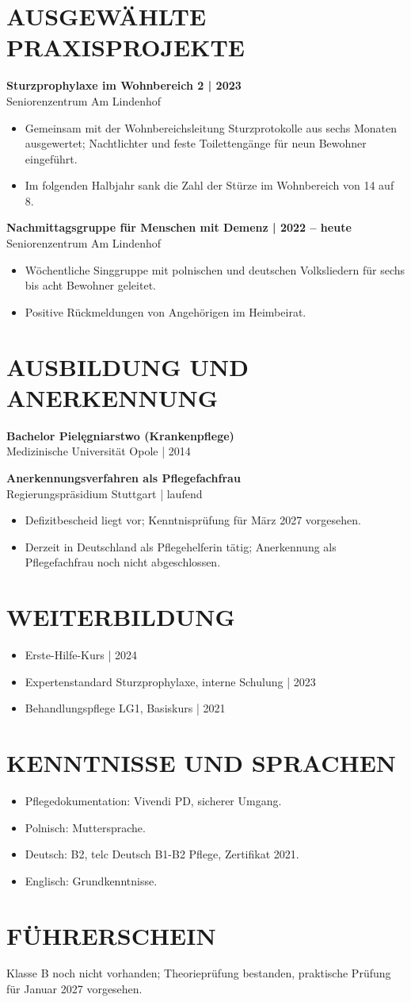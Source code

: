 \documentclass[11pt,a4paper]{article}
\newcommand{\cvsection}[1]{\section*{#1}}
\begin{document}
\newpage
\cvsection{AUSGEWÄHLTE PRAXISPROJEKTE}
\textbf{Sturzprophylaxe im Wohnbereich 2 | 2023}\\
Seniorenzentrum Am Lindenhof
\begin{itemize}
\item Gemeinsam mit der Wohnbereichsleitung Sturzprotokolle aus sechs Monaten ausgewertet; Nachtlichter und feste Toilettengänge für neun Bewohner eingeführt.
\item Im folgenden Halbjahr sank die Zahl der Stürze im Wohnbereich von 14 auf 8.
\end{itemize}

\textbf{Nachmittagsgruppe für Menschen mit Demenz | 2022 – heute}\\
Seniorenzentrum Am Lindenhof
\begin{itemize}
\item Wöchentliche Singgruppe mit polnischen und deutschen Volksliedern für sechs bis acht Bewohner geleitet.
\item Positive Rückmeldungen von Angehörigen im Heimbeirat.
\end{itemize}

\cvsection{AUSBILDUNG UND ANERKENNUNG}
\textbf{Bachelor Pielęgniarstwo (Krankenpflege)}\\
Medizinische Universität Opole | 2014

\textbf{Anerkennungsverfahren als Pflegefachfrau}\\
Regierungspräsidium Stuttgart | laufend
\begin{itemize}
\item Defizitbescheid liegt vor; Kenntnisprüfung für März 2027 vorgesehen.
\item Derzeit in Deutschland als Pflegehelferin tätig; Anerkennung als Pflegefachfrau noch nicht abgeschlossen.
\end{itemize}

\cvsection{WEITERBILDUNG}
\begin{itemize}
\item Erste-Hilfe-Kurs | 2024
\item Expertenstandard Sturzprophylaxe, interne Schulung | 2023
\item Behandlungspflege LG1, Basiskurs | 2021
\end{itemize}

\cvsection{KENNTNISSE UND SPRACHEN}
\begin{itemize}
\item Pflegedokumentation: Vivendi PD, sicherer Umgang.
\item Polnisch: Muttersprache.
\item Deutsch: B2, telc Deutsch B1-B2 Pflege, Zertifikat 2021.
\item Englisch: Grundkenntnisse.
\end{itemize}

\cvsection{FÜHRERSCHEIN}
Klasse B noch nicht vorhanden; Theorieprüfung bestanden, praktische Prüfung für Januar 2027 vorgesehen.
\end{document}
